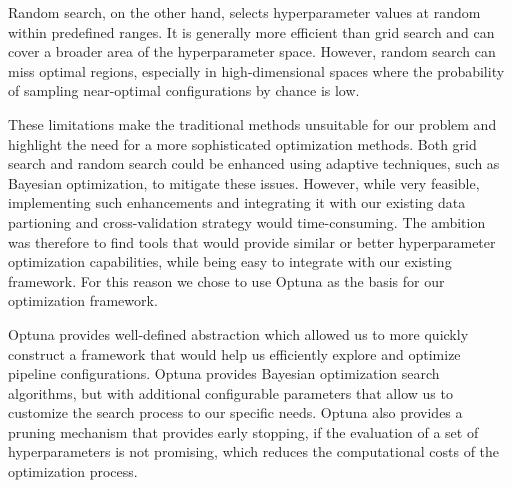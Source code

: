 Random search, on the other hand, selects hyperparameter values at random within predefined ranges. 
It is generally more efficient than grid search and can cover a broader area of the hyperparameter space. 
However, random search can miss optimal regions, especially in high-dimensional spaces where the probability of sampling near-optimal configurations by chance is low. 

These limitations make the traditional methods unsuitable for our problem and highlight the need for a more sophisticated optimization methods.
Both grid search and random search could be enhanced using adaptive techniques, such as Bayesian optimization, to mitigate these issues.
However, while very feasible, implementing such enhancements and integrating it with our existing data partioning and cross-validation strategy would time-consuming.
The ambition was therefore to find tools that would provide similar or better hyperparameter optimization capabilities, while being easy to integrate with our existing framework.
For this reason we chose to use Optuna as the basis for our optimization framework.

Optuna provides well-defined abstraction which allowed us to more quickly construct a framework that would help us efficiently explore and optimize pipeline configurations.\cite{optuna_2019}
Optuna provides Bayesian optimization search algorithms, but with additional configurable parameters that allow us to customize the search process to our specific needs.
Optuna also provides a pruning mechanism that provides early stopping, if the evaluation of a set of hyperparameters is not promising, which reduces the computational costs of the optimization process.




